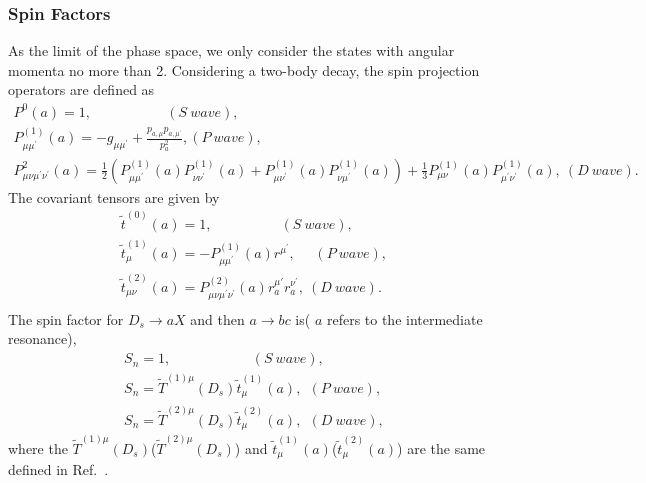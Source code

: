{    \subsubsection{Spin Factors}
    \par{
        As the limit of the phase space, we only consider the states with angular momenta no more than 2. 
        Considering a two-body decay, the spin projection operators are defined as  
        \begin{equation}
            \begin{array}{lr}
                P^{0}(a) = 1,   \ \ \ \ \ \  \ \ \ \ \ \  \ \ \ \ \ \ \ \ \ \ \ \        (S\ wave), &\\
                P^{(1)}_{\mu\mu^{'}}(a) = -g_{\mu\mu^{'}}+\frac{p_{a,\mu}p_{a,\mu^{'}}}{p_{a}^{2}},          (P\ wave), &\\
                P^{2}_{\mu\nu\mu^{'}\nu^{'}}(a) = \frac{1}{2}(P^{(1)}_{\mu\mu^{'}}(a)P^{(1)}_{\nu\nu^{'}}(a)+P^{(1)}_{\mu\nu^{'}}(a)P^{(1)}_{\nu\mu^{'}}(a))+\frac{1}{3}P^{(1)}_{\mu\nu}(a)P^{(1)}_{\mu^{'}\nu^{'}}(a),\           (D\ wave). &
            \end{array}\label{spin-projection-operators} 
        \end{equation}
       The covariant tensors are given by 
        \begin{equation}
            \begin{array}{lr}
                \tilde{t}^{(0)}(a) = 1, \ \ \ \ \ \  \ \ \ \ \ \   \ \ \ \ \ \ \ \ \ \       (S\ wave), &\\
                \tilde{t}^{(1)}_{\mu}(a) = -P^{(1)}_{\mu\mu^{'}}(a)r^{\mu^{'}},   \ \  \ \ \ \         (P\ wave), &\\
                \tilde{t}^{(2)}_{\mu\nu}(a) = P^{(2)}_{\mu\nu\mu^{'}\nu^{'}}(a)r^{\mu{'}}_{a}r^{\nu^{'}}_{a}, \           (D\ wave). &\\
            \end{array}\label{covariant-tensors} 
        \end{equation}
        The spin factor for $D_{s} \rightarrow aX$ and then $a \rightarrow bc$ is( $a$ refers to the intermediate resonance), 
        \begin{equation}
            \begin{array}{lr}
                S_{n} = 1,         \ \ \ \ \ \  \ \ \ \ \ \ \ \ \ \ \ \  \ \ \ \ \ \ \ \ (S\ wave), &\\
                S_{n} = \tilde{T}^{(1)\mu}(D_{s})\tilde{t}^{(1)}_{\mu}(a),\ \          (P\ wave), &\\
                S_{n} = \tilde{T}^{(2)\mu}(D_{s})\tilde{t}^{(2)}_{\mu}(a),\ \         (D\ wave), &
            \end{array}\label{spin-factor} 
        \end{equation}
        where the $\tilde{T}^{(1)\mu}(D_{s})$($\tilde{T}^{(2)\mu}(D_{s})$) and $\tilde{t}^{(1)}_{\mu}(a)$($\tilde{t}^{(2)}_{\mu}(a)$) are the same defined in Ref.~\cite{covariant-tensors}.
    }

}


